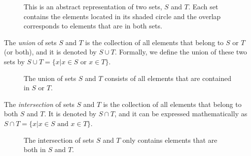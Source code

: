 \begin{figure}[htb!]
\begin{center}
\caption{This is an abstract representation of two sets, $S$ and $T$.
Each set contains the elements located in its shaded circle and the overlap corresponds to elements that are in both sets.}
\end{center}
\end{figure}

The \emph{union} of sets $S$ and $T$ is the collection of all elements that belong to $S$ or $T$ (or both), and it is denoted by $S \cup T$.
Formally, we define the union of these two sets by $S \cup T = \{ x | x \in S \text{ or } x \in T \}$.

\begin{figure}[htb!]
\begin{center}
\caption{The union of sets $S$ and $T$ consists of all elements that are contained in $S$ or $T$.}
\end{center}
\end{figure}

The \emph{intersection} of sets $S$ and $T$ is the collection of all elements that belong to both $S$ and $T$.
It is denoted by $S \cap T$, and it can be expressed mathematically as $S \cap T = \{ x | x \in S \text{ and } x \in T \}$.

\begin{figure}[htb!]
\begin{center}
\caption{The intersection of sets $S$ and $T$ only contains elements that are both in $S$ and $T$.}
\end{center}
\end{figure}

